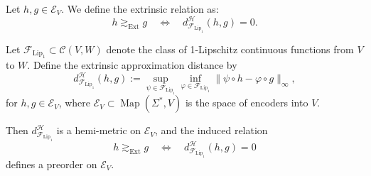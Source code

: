 

\begin{definition}
	Let $h, g \in \mathcal{E}_V$. 
	We define the extrinsic relation as:
	\[
	h \gtrsim_{\mathrm{Ext}} g \quad \Leftrightarrow \quad d_{\mathcal{F}_{\mathrm{Lip}_1}}^{\mathcal{H}}(h,g) = 0.
	\]
\end{definition}

\begin{proposition}
	Let \( \mathcal{F}_{\mathrm{Lip}_1} \subset \mathcal{C}(V, W) \) denote the class of 1-Lipschitz continuous functions from \( V \) to \( W \).  
	Define the extrinsic approximation distance by
	\[
	d_{\mathcal{F}_{\mathrm{Lip}_1}}^{\mathcal{H}}(h, g) := \sup_{\psi \in \mathcal{F}_{\mathrm{Lip}_1}} \inf_{\varphi \in \mathcal{F}_{\mathrm{Lip}_1}} \| \psi \circ h - \varphi \circ g \|_\infty,
	\]
	for \( h, g \in \mathcal{E}_V \), where \( \mathcal{E}_V \subset \operatorname{Map}(\Sigma^*, V) \) is the space of encoders into \( V \).
	
	Then \( d_{\mathcal{F}_{\mathrm{Lip}_1}}^{\mathcal{H}} \) is a hemi-metric on \( \mathcal{E}_V \), and the induced relation
	\[
	h \gtrsim_{\mathrm{Ext}} g \quad \Longleftrightarrow \quad d_{\mathcal{F}_{\mathrm{Lip}_1}}^{\mathcal{H}}(h, g) = 0
	\]
	defines a preorder on \( \mathcal{E}_V \).
\end{proposition}





